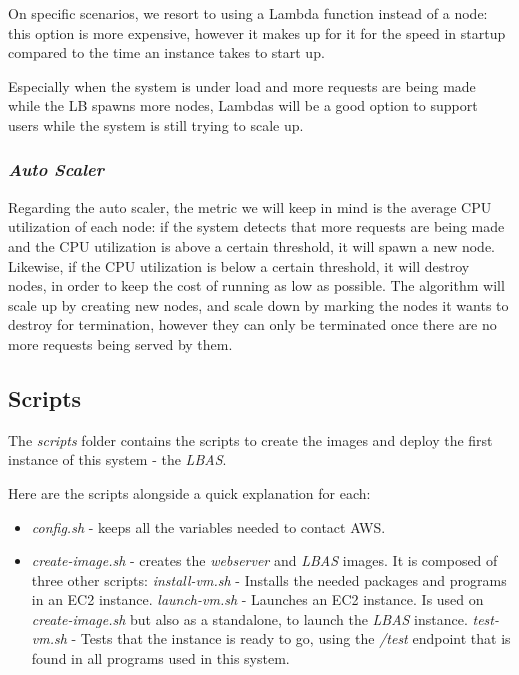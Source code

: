 \documentclass{article}
\begin{document}
On specific scenarios, we resort to using a Lambda function instead of a node:
this option is more expensive, however it makes up for it for the speed in
startup compared to the time an instance takes to start up.

Especially when the system is under load and more requests are being made while
the LB spawns more nodes, Lambdas will be a good option to support users while
the system is still trying to scale up.

\subsubsection{\textit{Auto Scaler}}

Regarding the auto scaler, the metric we will keep in mind is the average CPU
utilization of each node: if the system detects that more requests are being
made and the CPU utilization is above a certain threshold, it will spawn a new
node. Likewise, if the CPU utilization is below a certain threshold, it will
destroy nodes, in order to keep the cost of running as low as possible. The
algorithm will scale up by creating new nodes, and scale down by marking the
nodes it wants to destroy for termination, however they can only be terminated
once there are no more requests being served by them.

\subsection{Scripts}

The \textit{scripts} folder contains the scripts to create the images and deploy
the first instance of this system - the \textit{LBAS}.

Here are the scripts alongside a quick explanation for each:

\begin{itemize}
    \item \textit{config.sh} - keeps all the variables needed to contact AWS.
    \item \textit{create-image.sh} - creates the \textit{webserver} and \textit{LBAS}
        images. It is composed of three other scripts:
    \subitem \textit{install-vm.sh} - Installs the needed packages and programs
        in an EC2 instance.
    \subitem \textit{launch-vm.sh} - Launches an EC2 instance. Is used on
        \textit{create-image.sh} but also as a standalone, to launch the
        \textit{LBAS} instance.
    \subitem \textit{test-vm.sh} - Tests that the instance is ready to go, using
        the \textit{/test} endpoint that is found in all programs used in this
        system.
\end{itemize}
\end{document}
